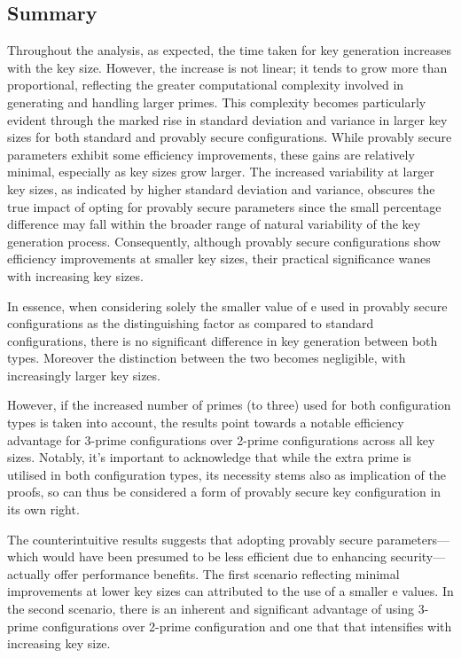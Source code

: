 \documentclass[]{final_report}
\theoremstyle{definition}
\begin{document}
\subsection*{Summary}
Throughout the analysis, as expected, the time taken for key generation increases with the key size. However, the increase is not linear; it tends to grow more than proportional, reflecting the greater computational complexity involved in generating and handling larger primes. This complexity becomes particularly evident through the marked rise in standard deviation and variance in larger key sizes for both standard and provably secure configurations.
While provably secure parameters exhibit some efficiency improvements, these gains are relatively minimal, especially as key sizes grow larger. The increased variability at larger key sizes, as indicated by higher standard deviation and variance, obscures the true impact of opting for provably secure parameters since the small percentage difference may fall within the broader range of natural variability of the key generation process. Consequently, although provably secure configurations show efficiency improvements at smaller key sizes, their practical significance wanes with increasing key sizes.

In essence, when considering solely the smaller value of e used in provably secure configurations as the distinguishing factor as compared to standard configurations, there is no significant difference in key generation between both types. Moreover the distinction between the two becomes negligible, with increasingly larger key sizes. 

However, if the increased number of primes (to three) used for both configuration types is taken into account, the results point towards a notable efficiency advantage for 3-prime configurations over 2-prime configurations across all key sizes. Notably, it's important to acknowledge that while the extra prime is utilised in both configuration types, its necessity stems also as implication of the proofs, so can thus be considered a form of provably secure key configuration in its own right. 

The counterintuitive results suggests that adopting provably secure parameters—which would have been presumed to be less efficient due to enhancing security— actually offer performance benefits. The first scenario reflecting minimal improvements at lower key sizes can attributed to the use of  a smaller e values. In the second scenario, there is an inherent and significant advantage of using 3-prime configurations over 2-prime configuration and one that that intensifies with increasing key size.
\end{document}
